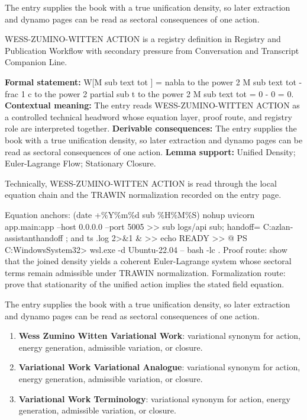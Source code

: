 The entry supplies the book with a true unification density, so later extraction and dynamo pages can be read as sectoral consequences of one action.
\clearpage


\begingroup\small
{}
WESS-ZUMINO-WITTEN ACTION is a registry definition in Registry and Publication Workflow with secondary pressure from Conversation and Transcript Companion Line.

\begingroup\footnotesize\setlength{\emergencystretch}{3em}\sloppy
\textbf{Formal statement:} W[M sub text tot ] = nabla to the power 2 M sub text tot - frac 1 c to the power 2 partial sub t to the power 2 M sub text tot = 0 - 0 = 0. \textbf{Contextual meaning:} The entry reads WESS-ZUMINO-WITTEN ACTION as a controlled technical headword whose equation layer, proof route, and registry role are interpreted together. \textbf{Derivable consequences:} The entry supplies the book with a true unification density, so later extraction and dynamo pages can be read as sectoral consequences of one action. \textbf{Lemma support:} Unified Density; Euler-Lagrange Flow; Stationary Closure.\par
\endgroup

Technically, WESS-ZUMINO-WITTEN ACTION is read through the local equation chain and the TRAWIN normalization recorded on the entry page.

Equation anchors: (date +\%Y\%m\%d sub \%H\%M\%S) nohup uvicorn app.main:app --host 0.0.0.0 --port 5005 >> sub logs/api sub; handoff= C:azlan-assistanthandoff ; and ts .log 2>\&1 \& >> echo READY >> @ PS C:WindowsSystem32> wsl.exe -d Ubuntu-22.04 -- bash -lc . Proof route: show that the joined density yields a coherent Euler-Lagrange system whose sectoral terms remain admissible under TRAWIN normalization. Formalization route: prove that stationarity of the unified action implies the stated field equation.

The entry supplies the book with a true unification density, so later extraction and dynamo pages can be read as sectoral consequences of one action.
\endgroup

\begin{enumerate}[leftmargin=1.6em,itemsep=6pt,topsep=4pt]
\item \textbf{Wess Zumino Witten Variational Work}: variational synonym for action, energy generation, admissible variation, or closure.
\item \textbf{Variational Work Variational Analogue}: variational synonym for action, energy generation, admissible variation, or closure.
\item \textbf{Variational Work Terminology}: variational synonym for action, energy generation, admissible variation, or closure.
\end{enumerate}

